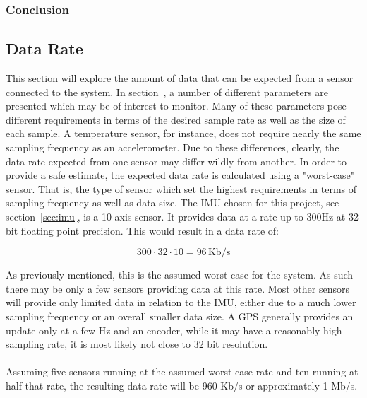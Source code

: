 \subsubsection*{Conclusion}


\subsection{Data Rate}
This section will explore the amount of data that can be expected from a sensor connected to the system.
In section~\label{sec:parameters}, a number of different parameters are presented which may be of interest to monitor.
Many of these parameters pose different requirements in terms of the desired sample rate as well as the size of each sample.
A temperature sensor, for instance, does not require nearly the same sampling frequency as an accelerometer.
Due to these differences, clearly, the data rate expected from one sensor may differ wildly from another.
In order to provide a safe estimate, the expected data rate is calculated using a "worst-case" sensor.
That is, the type of sensor which set the highest requirements in terms of sampling frequency as well as data size.
The IMU chosen for this project, see section~\ref{sec:imu}, is a 10-axis sensor.
It provides data at a rate up to 300\si{\hertz} at 32 bit floating point precision.
This would result in a data rate of:

$$300\cdot32\cdot10=96\,\text{Kb/s}$$

As previously mentioned, this is the assumed worst case for the system.
As such there may be only a few sensors providing data at this rate.
Most other sensors will provide only limited data in relation to the IMU, either due to a much lower sampling frequency or an overall smaller data size.
A GPS generally provides an update only at a few \si{\hertz} and an encoder, while it may have a reasonably high sampling rate, it is most likely not close to 32 bit resolution.
\\~\\
Assuming five sensors running at the assumed worst-case rate and ten running at half that rate, the resulting data rate will be 960 Kb/s or approximately 1 Mb/s.


